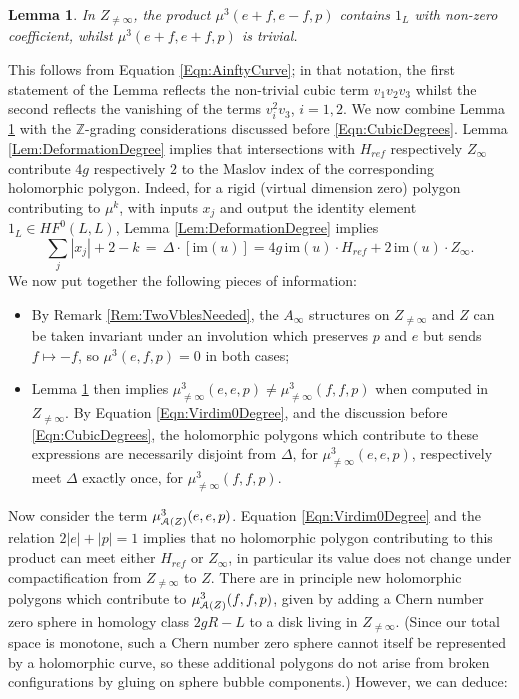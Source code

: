 \documentclass[reqno,10pt]{amsart}
\numberwithin{equation}{section}
\newcommand{\bZ}{{\mathbb Z}}
\newcommand{\scrA}{\EuScript{A}}
\newcommand{\im}{\mathrm{im}}
\newtheorem{Lemma}[thm]{Lemma}
\theoremstyle{remark}
\begin{document}
\begin{Lemma} \label{Lem:CubicOpen}
In $Z_{\neq\infty}$, the product $\mu^3(e+f, e-f, p)$ contains $1_L$ with non-zero coefficient, whilst $\mu^3(e+f,e+f,p)$ is trivial.
\end{Lemma}

This follows from Equation \ref{Eqn:AinftyCurve}; in that notation, the first statement of the Lemma reflects the non-trivial cubic term $v_1v_2v_3$ whilst the second reflects the  vanishing of the terms $v_i^2v_3$, $i=1,2$.   We now combine Lemma \ref{Lem:CubicOpen} with the $\bZ$-grading considerations discussed before \eqref{Eqn:CubicDegrees}.   Lemma \ref{Lem:DeformationDegree} implies that intersections with $H_{ref}$ respectively $Z_{\infty}$ contribute $4g$ respectively $2$ to the Maslov index of the corresponding holomorphic polygon.  Indeed, for a rigid (virtual dimension zero) polygon contributing to $\mu^k$, with inputs $x_j$ and output the identity element $1_L \in HF^0(L,L)$, Lemma \ref{Lem:DeformationDegree} implies
\begin{equation} \label{Eqn:Virdim0Degree}
\sum_j |x_j| + 2-k \, = \, \Delta \cdot [\im(u)] = 4g\, \im(u)\cdot H_{ref} + 2\, \im(u) \cdot Z_{\infty}.
\end{equation}
We now put together the following pieces of information:
\begin{itemize}
\item By Remark \ref{Rem:TwoVblesNeeded}, the $A_{\infty}$ structures on $Z_{\neq\infty}$ and $Z$ can be taken invariant under an involution which preserves $p$ and $e$ but sends $f\mapsto -f$, so $\mu^3(e,f,p) = 0$ in both cases;
\item Lemma \ref{Lem:CubicOpen} then implies $\mu^3_{\neq\infty}(e,e,p) \neq \mu^3_{\neq\infty}(f,f,p)$ when computed in $Z_{\neq\infty}$.  By Equation \ref{Eqn:Virdim0Degree}, and the discussion before \eqref{Eqn:CubicDegrees}, the holomorphic polygons which contribute to  these expressions are necessarily disjoint from $\Delta$, for $\mu^3_{\neq\infty}(e,e,p)$, respectively meet $\Delta$ exactly once, for $\mu^3_{\neq\infty}(f,f,p)$.
\end{itemize}

Now consider the term $\mu^3_{\scrA(Z)}(e,e,p)$.  Equation \ref{Eqn:Virdim0Degree} and the relation $2|e|+|p|=1$ implies that no holomorphic polygon contributing to this product can meet either $H_{ref}$ or $Z_{\infty}$, in particular its value does not change under compactification from $Z_{\neq\infty}$ to $Z$.  There are in principle new holomorphic polygons which contribute to $\mu^3_{\scrA(Z)}(f,f,p)$, given by adding a Chern number zero sphere in homology class $2gR-L$ to a disk living in $Z_{\neq\infty}$.  (Since our total space is monotone, such a Chern number zero sphere cannot itself be represented by a holomorphic curve, so these additional polygons do not arise from broken configurations by gluing on  sphere bubble components.)  However, we can deduce:
\end{document}

